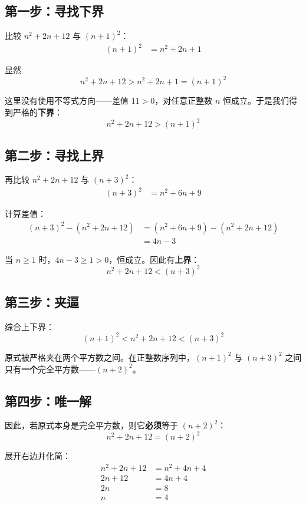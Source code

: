 \documentclass[11pt,a4paper]{ctexart}
\newcommand{\highlight}[1]{\colorbox{accent!20}{\sffamily\bfseries #1}}
\begin{document}
\subsection*{第一步：寻找下界}

比较 $n^2 + 2n + 12$ 与 $(n+1)^2$：
\begin{align*}
  (n+1)^2 &= n^2 + 2n + 1
\end{align*}

显然
\[
  n^2 + 2n + 12 > n^2 + 2n + 1 = (n+1)^2
\]

这里没有使用不等式方向——差值 $11 > 0$，对任意正整数 $n$ 恒成立。于是我们得到严格的\highlight{下界}：
\[
  \boxed{n^2 + 2n + 12 > (n+1)^2}
\]

\subsection*{第二步：寻找上界}

再比较 $n^2 + 2n + 12$ 与 $(n+3)^2$：
\begin{align*}
  (n+3)^2 &= n^2 + 6n + 9
\end{align*}

计算差值：
\begin{align*}
  (n+3)^2 - (n^2 + 2n + 12) &= (n^2 + 6n + 9) - (n^2 + 2n + 12) \\
  &= 4n - 3
\end{align*}

当 $n \geqslant 1$ 时，$4n - 3 \geqslant 1 > 0$，恒成立。因此有\highlight{上界}：
\[
  \boxed{n^2 + 2n + 12 < (n+3)^2}
\]

\subsection*{第三步：夹逼}

综合上下界：
\[
  (n+1)^2 < n^2 + 2n + 12 < (n+3)^2
\]

原式被严格夹在两个平方数之间。在正整数序列中，$(n+1)^2$ 与 $(n+3)^2$ 之间只有\highlight{一个}完全平方数——$(n+2)^2$。

\subsection*{第四步：唯一解}

因此，若原式本身是完全平方数，则它\highlight{必须}等于 $(n+2)^2$：
\[
  n^2 + 2n + 12 = (n+2)^2
\]

展开右边并化简：
\begin{align*}
  n^2 + 2n + 12 &= n^2 + 4n + 4 \\
  2n + 12 &= 4n + 4 \\
  2n &= 8 \\
  n &= 4
\end{align*}
\end{document}
